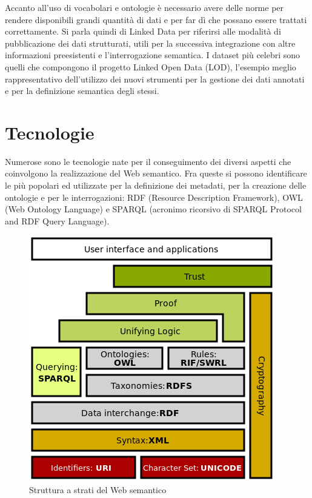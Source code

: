 \documentclass[Lau,binding=0.6cm,noexaminfo,oneside]{sapthesis}
\begin{document}
Accanto all'uso di vocabolari e ontologie è necessario avere delle norme per rendere disponibili grandi quantità di dati e per far dì che possano essere trattati correttamente. Si parla quindi di Linked Data per riferirsi alle modalità di pubblicazione dei dati strutturati, utili per la successiva integrazione con altre informazioni preesistenti e l'interrogazione semantica.
I dataset più celebri sono quelli che compongono il progetto Linked Open Data (LOD), l'esempio meglio rappresentativo dell'utilizzo dei nuovi strumenti per la gestione dei dati annotati e per la definizione semantica degli stessi.\medskip

\section{Tecnologie}

Numerose sono le tecnologie nate per il conseguimento dei diversi aspetti che coinvolgono la realizzazione del Web semantico. Fra queste si possono identificare le più popolari ed utilizzate per la definizione dei metadati, per la creazione delle ontologie e per le interrogazioni: RDF (Resource Description Framework), OWL (Web Ontology Language) e SPARQL (acronimo ricorsivo di SPARQL Protocol and RDF Query Language).\medskip

\begin{figure}[!ht]
  \centering
  \includegraphics[scale=0.45]{pila.png}
  \caption{Struttura a strati del Web semantico}
\end{figure}
\end{document}

